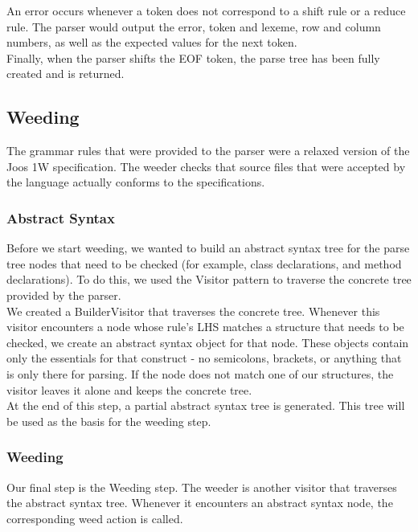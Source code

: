 \documentclass[12pt, a4paper]{article}
\begin{document}
An error occurs whenever a token does not correspond to a shift rule or a reduce rule. The parser would output the error, token and lexeme, row and column numbers, as well as the expected values for the next token. \\

Finally, when the parser shifts the EOF token, the parse tree has been fully created and is returned.

\subsection{Weeding}

The grammar rules that were provided to the parser were a relaxed version of the Joos 1W specification. The weeder checks that source files that were accepted by the language actually conforms to the specifications.

\subsubsection{Abstract Syntax}
Before we start weeding, we wanted to build an abstract syntax tree for the parse tree nodes that need to be checked (for example, class declarations, and method declarations). To do this, we used the Visitor pattern to traverse the concrete tree provided by the parser. \\

We created a BuilderVisitor that traverses the concrete tree. Whenever this visitor encounters a node whose rule's LHS matches a structure that needs to be checked, we create an abstract syntax object for that node. These objects contain only the essentials for that construct - no semicolons, brackets, or anything that is only there for parsing. If the node does not match one of our structures, the visitor leaves it alone and keeps the concrete tree. \\

At the end of this step, a partial abstract syntax tree is generated. This tree will be used as the basis for the weeding step.

\subsubsection{Weeding}

Our final step is the Weeding step. The weeder is another visitor that traverses the abstract syntax tree. Whenever it encounters an abstract syntax node, the corresponding weed action is called. \\
\end{document}
